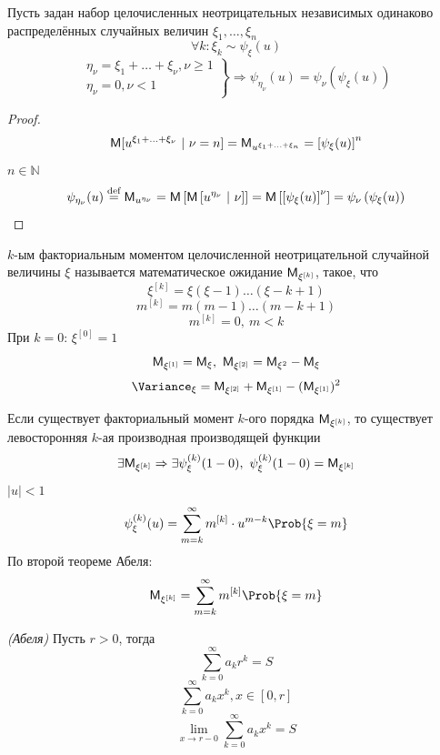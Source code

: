 \begin{theorem}
	Пусть задан набор целочисленных неотрицательных независимых одинаково распределённых случайных величин $\xi_1, \ldots, \xi_n$
\[
	\forall k: \xi_k \sim \psi_{\xi} (u)
\]
\[
	\left.
	\begin{aligned}
	\eta_{\nu} = \xi_1 + \ldots + \xi_{\nu}, \nu \geqslant 1 \\
	\eta_{\nu} = 0, \nu < 1
	\end{aligned}
	\right	\} \Rightarrow \psi_{\eta_{\nu}} (u) = \psi_{\nu} (\psi_{\xi} (u))
\]
\end{theorem}
\begin{proof}
\[
	\mathsf{M} [u^{\xi_1 + \ldots + \xi_{\nu}} \ | \ \nu = n] = \mathsf{M}_{u^{\xi_1 + \ldots + \xi_n}} = \left[ \psi_{\xi} (u) \right]^n
\]
$n \in \mathbb{N}$
\[
	\psi_{\eta_{\nu}} (u) \overset{\textrm{def}}{=} \mathsf{M}_{u^{\eta_{\nu}}} = \mathsf{M} \left[ \mathsf{M} \left[ u^{\eta_{\nu}} \ | \ \nu \right] \right] = \mathsf{M} \left[ \left[ \psi_{\xi} (u) \right]^{\nu} \right] = \psi_{\nu} \left( \psi_{\xi} (u)\right) 
\]
\end{proof}
\begin{definition}
	$k$-ым факториальным моментом целочисленной неотрицательной случайной величины $\xi$ называется математическое ожидание $\mathsf{M}_{{\xi}^{[k]}}$, такое, что
    \[
	    \xi^{[k]} = \xi (\xi - 1) \ldots (\xi - k + 1)
    \] 
	\[
		m^{[k]} = m (m - 1) \ldots (m - k + 1)
	\]
	\[
		m^{[k]} = 0, \ m < k
	\]
	При $k = 0$: $\xi^{[0]} = 1$
	\[
		\MExpect_{\xi^{[1]}} = \MExpect_{\xi}, \ \MExpect_{\xi^{[2]}} = \MExpect_{\xi^{2}} - \MExpect_{\xi}
	\]
	\[
		\Variance_{\xi} = \MExpect_{\xi^{[2]}} + \MExpect_{\xi^{[1]}} - (\MExpect_{\xi^{[1]}})^2
	\]
\end{definition}
\begin{theorem}
	Если существует факториальный момент $k$-ого порядка $\mathsf{M}_{\xi^{[k]}}$, то существует левосторонняя $k$-ая производная производящей функции
	\[
		\exists \MExpect_{\xi^{[k]}} \Rightarrow \exists \psi_{\xi}^{(k)} (1 - 0), \ \psi_{\xi}^{(k)} (1 - 0) = \MExpect_{\xi^{[k]}}
	\]
$|u| < 1$
\[
	\psi_{\xi}^{(k)} (u) = \sum\limits_{m = k}^{\infty} m^{[k]} \cdot u^{m - k} \Prob \{ \xi = m \}
\]
По второй теореме Абеля:
	\[
		\MExpect_{\xi^{[k]}} = \sum\limits_{m = k}^{\infty} m^{[k]} \Prob \{ \xi = m \}
	\]
\end{theorem}
\begin{theorem}
	\textit{(Абеля)} Пусть $r > 0$, тогда
	\[
		\sum\limits_{k = 0}^{\infty} a_k r^k = S
	\]
	\[
		\sum\limits_{k = 0}^{\infty} a_k x^k, x \in [0, r]
	\]
	\[
		\lim\limits_{x \to r - 0} \sum\limits_{k = 0}^{\infty} a_k x^k = S
	\]
\end{theorem}
